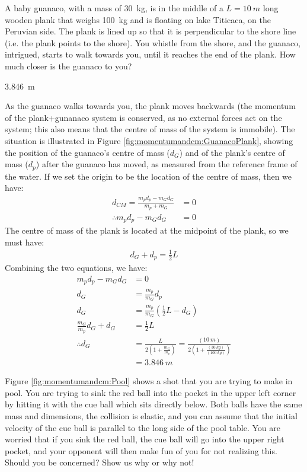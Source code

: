\question A baby guanaco, with a mass of \SI{30}{kg}, is in the middle of a $L=\SI{10}{m}$ long wooden plank that weighs \SI{100}{kg} and is floating on lake Titicaca, on the Peruvian side. The plank is lined up so that it is perpendicular to the shore line (i.e. the plank points to the shore). You whistle from the shore, and the guanaco, intrigued, starts to walk towards you, until it reaches the end of the plank. How much closer is the guanaco to you? 

\begin{finalanswer}
\SI{3.846}{m}
\end{finalanswer}
\begin{solution}
As the guanaco walks towards you, the plank moves backwards (the momentum of the plank+gunanaco system is conserved, as no external forces act on the system; this also means that the centre of mass of the system is immobile). The situation is illustrated in Figure \ref{fig:momentumandcm:GuanacoPlank}, showing the position of the guanaco's centre of mass ($d_G$) and of the plank's centre of mass ($d_p$) after the guanaco has moved, as measured from the reference frame of the water. 
If we set the origin to be the location of the centre of mass, then we have:
\begin{align*}
d_{CM}=\frac{m_pd_p-m_Gd_G}{m_p+m_G}&=0\\
\therefore m_pd_p-m_Gd_G&=0
\end{align*}
The centre of mass of the plank is located at the midpoint of the plank, so we must have:
\begin{align*}
d_G+d_p=\frac{1}{2}L
\end{align*}
Combining the two equations, we have:
\begin{align*}
m_pd_p-m_Gd_G &=0\\
d_G&=\frac{m_p}{m_G}d_p\\
d_G&=\frac{m_p}{m_G}(\frac{1}{2}L-d_G)\\
\frac{m_G}{m_p}d_G+d_G&=\frac{1}{2}L\\
\therefore d_G&=\frac{L}{2\left(1+\frac{m_G}{m_p}\right)}=\frac{(\SI{10}{m})}{2\left(1+\frac{(\SI{30}{kg})}{(\SI{100}{kg})}\right)}\\
&=\SI{3.846}{m}
\end{align*}
\end{solution}

\question Figure \ref{fig:momentumandcm:Pool} shows a shot that you are trying to make in pool. You are trying to sink the red ball into the pocket in the upper left corner by hitting it with the cue ball which sits directly below. Both balls have the same mass and dimensions, the collision is elastic, and you can assume that the initial velocity of the cue ball is parallel to the long side of the pool table. You are worried that if you sink the red ball, the cue ball will go into the upper right pocket, and your opponent will then make fun of you for not realizing this. Should you be concerned? Show us why or why not!

